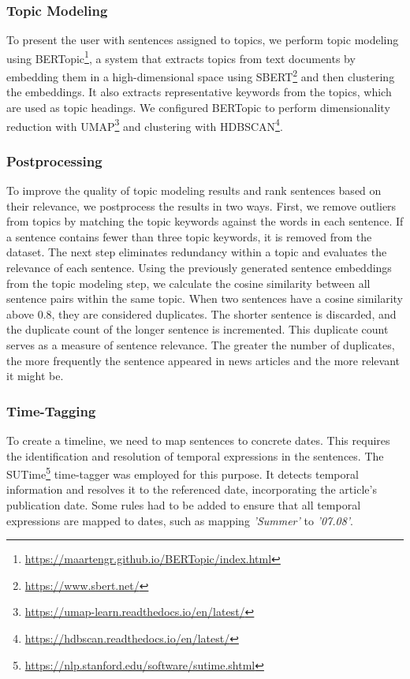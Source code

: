 \documentclass[sigconf]{acmart}
\begin{document}
\subsubsection{Topic Modeling}
To present the user with sentences assigned to topics, we perform topic modeling using BERTopic\footnote{\url{https://maartengr.github.io/BERTopic/index.html}}, a system that extracts topics from text documents by embedding them in a high-dimensional space using SBERT\footnote{\url{https://www.sbert.net/}} and then clustering the embeddings.
It also extracts representative keywords from the topics, which are used as topic headings. We configured BERTopic to perform dimensionality reduction with UMAP\footnote{\url{https://umap-learn.readthedocs.io/en/latest/}} and clustering with HDBSCAN\footnote{\url{https://hdbscan.readthedocs.io/en/latest/}}.

\subsubsection{Postprocessing}
To improve the quality of topic modeling results and rank sentences based on their relevance, we postprocess the results in two ways.
First, we remove outliers from topics by matching the topic keywords against the words in each sentence. If a sentence contains fewer than three topic keywords, it is removed from the dataset.
The next step eliminates redundancy within a topic and evaluates the relevance of each sentence. Using the previously generated sentence embeddings from the topic modeling step, we calculate the cosine similarity between all sentence pairs within the same topic. When two sentences have a cosine similarity above 0.8, they are considered duplicates. The shorter sentence is discarded, and the duplicate count of the longer sentence is incremented. This duplicate count serves as a measure of sentence relevance. The greater the number of duplicates, the more frequently the sentence appeared in news articles and the more relevant it might be.

\subsubsection{Time-Tagging}
To create a timeline, we need to map sentences to concrete dates. This requires the identification and resolution of temporal expressions in the sentences. The SUTime\footnote{\url{https://nlp.stanford.edu/software/sutime.shtml}} time-tagger was employed for this purpose. It detects temporal information and resolves it to the referenced date, incorporating the article's publication date.
Some rules had to be added to ensure that all temporal expressions are mapped to dates, such as mapping \textit{'Summer'} to \textit{'07.08'}.
\end{document}
